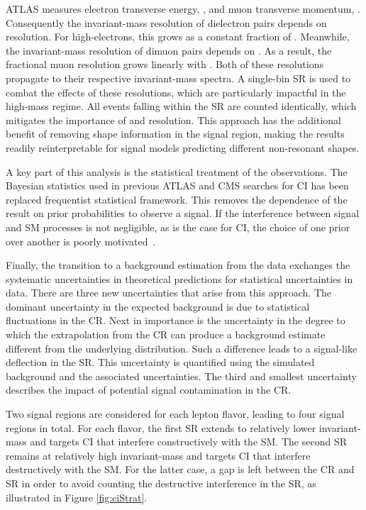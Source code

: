 ATLAS measures electron transverse energy, \et, and muon transverse momentum, \pt.
Consequently the invariant-mass resolution of dielectron pairs depends on \et resolution.
For high-\et electrons, this grows as a constant fraction of \et. 
Meanwhile, the invariant-mass resolution of dimuon pairs depends on \pt.
As a result, the fractional muon resolution grows linearly with \pt.
Both of these resolutions propagate to their respective invariant-mass spectra.
A single-bin SR is used to combat the effects of these resolutions, which are particularly impactful in the high-mass regime.
All events falling within the SR are counted identically, which mitigates the importance of \et and \pt resolution.
This approach has the additional benefit of removing shape information in the signal region, making the results readily reinterpretable for signal models predicting different non-resonant shapes.

A key part of this analysis is the statistical treatment of the observations.
The Bayesian statistics used in previous ATLAS and CMS searches for CI has been replaced frequentist statistical framework.
This removes the dependence of the result on prior probabilities to observe a signal.
If the interference between signal and SM processes is not negligible, as is the case for CI, the choice of one prior over another is poorly motivated~\cite{Aad:2012hf,EXOT-2016-05}.

Finally, the transition to a background estimation from the data exchanges the systematic uncertainties in theoretical predictions for statistical uncertainties in data.
There are three new uncertainties that arise from this approach.
The dominant uncertainty in the expected background is due to statistical fluctuations in the CR.
Next in importance is the uncertainty in the degree to which the extrapolation from the CR can produce a background estimate different from the underlying distribution. Such a difference leads to a signal-like deflection in the SR. This uncertainty is quantified using the simulated background and the associated uncertainties.
The third and smallest uncertainty describes the impact of potential signal contamination in the CR.

Two signal regions are considered for each lepton flavor, leading to four signal regions in total.
For each flavor, the first SR extends to relatively lower invariant-mass and targets CI that interfere constructively with the SM.
The second SR remains at relatively high invariant-mass and targets CI that interfere destructively with the SM.
For the latter case, a gap is left between the CR and SR in order to avoid counting the destructive interference in the SR, as illustrated in Figure \ref{fig:ciStrat}.

